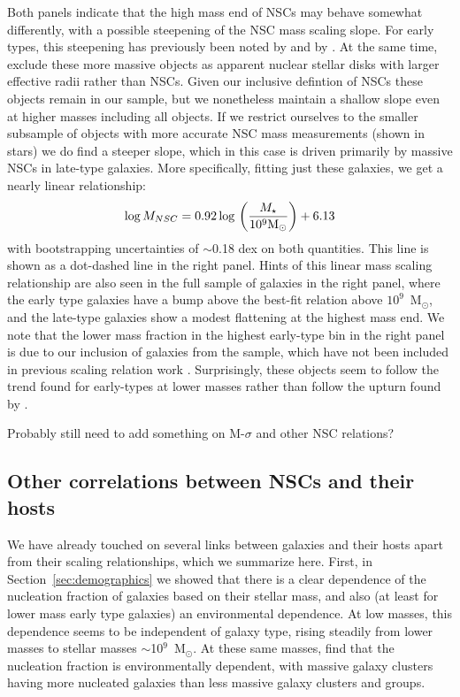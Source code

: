 Both panels indicate that the high mass end of NSCs may behave somewhat differently, with a possible steepening of the NSC mass scaling slope.  For early types, this steepening has previously been noted by \citet{denbrok14} and by \citet{sanchez-janssen19}. At the same time, \citet{scott13} exclude these more massive objects as apparent nuclear stellar disks with larger effective radii rather than NSCs.  Given our inclusive defintion of NSCs these objects remain in our sample, but we nonetheless maintain a shallow slope even at higher masses including all objects.  If we restrict ourselves to the smaller subsample of objects with more accurate NSC mass measurements (shown in stars) we do find a steeper slope, which in this case is driven  primarily by massive NSCs in late-type galaxies.  More specifically, fitting just these galaxies, we get a nearly linear relationship:
\begin{equation}
    {\rm log}\,M_{NSC} = 0.92\,{\rm log}\, \left( \frac{M_\star}{10^9 {\rm M}_\odot} \right) + 6.13
\end{equation}
with bootstrapping uncertainties of $\sim$0.18 dex on both quantities.  This line is shown as a dot-dashed line in the right panel.  Hints of this linear mass scaling relationship are also seen in the full sample of galaxies in the right panel, where the early type galaxies have a bump above the best-fit relation above $10^9$~M$_\odot$, and the late-type galaxies show a modest flattening at the highest mass end.  We note that the lower mass fraction in the highest early-type bin in the right panel is due to our inclusion of galaxies from the \citet{lauer05} sample, which have not been included in previous scaling relation work \citep[i.e.][]{scott13,sanchez-janssen19}.  Surprisingly, these objects seem to follow the trend found for early-types at lower masses rather than follow the upturn found by \citet{sanchez-janssen19}.  

Probably still need to add something on M-$\sigma$ and other NSC relations?

\subsection{Other correlations between NSCs and their hosts}

 We have already touched on several links between galaxies and their hosts apart from their scaling relationships, which we summarize here.  First, in Section~\ref{sec:demographics} we showed that there is a clear dependence of the nucleation fraction of galaxies based on their stellar mass, and also (at least for lower mass early type galaxies) an environmental dependence.  At low masses, this dependence seems to be independent of galaxy type, rising steadily from lower masses to stellar masses $\sim$10$^9$~M$_\odot$.  At these same masses, \citet{sanchez-janssen19} find that the nucleation fraction is environmentally dependent, with massive galaxy clusters having more nucleated galaxies than less massive galaxy clusters and groups.  


